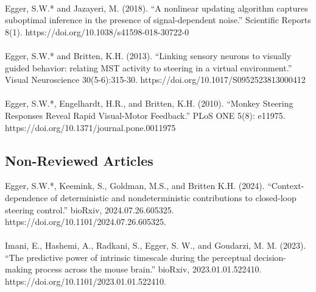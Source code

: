 \documentclass[a4paper,9pt]{extarticle}
\begin{document}
    \\
    Egger, S.W.* and Jazayeri, M. (2018). “A nonlinear updating algorithm captures suboptimal inference in the presence of signal-dependent noise.” Scientific Reports 8(1). https://doi.org/10.1038/s41598-018-30722-0 \\
    \\
    Egger, S.W.* and Britten, K.H. (2013). “Linking sensory neurons to visually guided behavior: relating MST activity to steering in a virtual environment.” Visual Neuroscience 30(5-6):315-30. https://doi.org/10.1017/S0952523813000412 \\
    \\
    Egger, S.W.*, Engelhardt, H.R., and Britten, K.H. (2010). “Monkey Steering Responses Reveal Rapid Visual-Motor Feedback.” PLoS ONE 5(8): e11975. https://doi.org/10.1371/journal.pone.0011975 \\
    \subsection*{Non-Reviewed Articles}
    Egger, S.W.*, Keemink, S., Goldman, M.S., and Britten K.H. (2024). “Context-dependence of deterministic and nondeterministic contributions to closed-loop steering control.” bioRxiv, 2024.07.26.605325. https://doi.org/10.1101/2024.07.26.605325. \\
    \\
    Imani, E., Hashemi, A., Radkani, S., Egger, S. W., and Goudarzi, M. M. (2023). “The predictive power of intrinsic timescale during the perceptual decision-making process across the mouse brain.” bioRxiv, 2023.01.01.522410. https://doi.org/10.1101/2023.01.01.522410. \\
    
\end{document}
